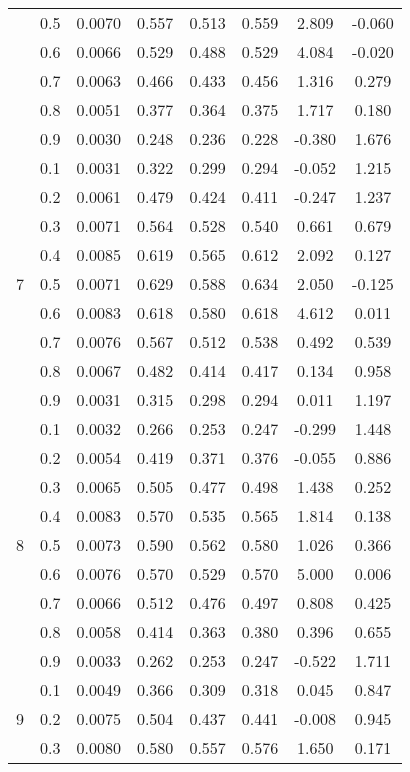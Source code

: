 \documentclass[11pt,a4paper]{report}
\begin{document}
\begin{longtable}{ | c | c || c | c | c | c | c | c | }
 & 0.5 & 0.0070 & 0.557 & 0.513 & 0.559 & 2.809 & -0.060 \\
 & 0.6 & 0.0066 & 0.529 & 0.488 & 0.529 & 4.084 & -0.020 \\
 & 0.7 & 0.0063 & 0.466 & 0.433 & 0.456 & 1.316 & 0.279 \\
 & 0.8 & 0.0051 & 0.377 & 0.364 & 0.375 & 1.717 & 0.180 \\
 & 0.9 & 0.0030 & 0.248 & 0.236 & 0.228 & -0.380 & 1.676 \\
 \hline
\multirow{9}{*}{7} & 0.1 & 0.0031 & 0.322 & 0.299 & 0.294 & -0.052 & 1.215 \\
 & 0.2 & 0.0061 & 0.479 & 0.424 & 0.411 & -0.247 & 1.237 \\
 & 0.3 & 0.0071 & 0.564 & 0.528 & 0.540 & 0.661 & 0.679 \\
 & 0.4 & 0.0085 & 0.619 & 0.565 & 0.612 & 2.092 & 0.127 \\
 & 0.5 & 0.0071 & 0.629 & 0.588 & 0.634 & 2.050 & -0.125 \\
 & 0.6 & 0.0083 & 0.618 & 0.580 & 0.618 & 4.612 & 0.011 \\
 & 0.7 & 0.0076 & 0.567 & 0.512 & 0.538 & 0.492 & 0.539 \\
 & 0.8 & 0.0067 & 0.482 & 0.414 & 0.417 & 0.134 & 0.958 \\
 & 0.9 & 0.0031 & 0.315 & 0.298 & 0.294 & 0.011 & 1.197 \\
 \hline
\multirow{9}{*}{8} & 0.1 & 0.0032 & 0.266 & 0.253 & 0.247 & -0.299 & 1.448 \\
 & 0.2 & 0.0054 & 0.419 & 0.371 & 0.376 & -0.055 & 0.886 \\
 & 0.3 & 0.0065 & 0.505 & 0.477 & 0.498 & 1.438 & 0.252 \\
 & 0.4 & 0.0083 & 0.570 & 0.535 & 0.565 & 1.814 & 0.138 \\
 & 0.5 & 0.0073 & 0.590 & 0.562 & 0.580 & 1.026 & 0.366 \\
 & 0.6 & 0.0076 & 0.570 & 0.529 & 0.570 & 5.000 & 0.006 \\
 & 0.7 & 0.0066 & 0.512 & 0.476 & 0.497 & 0.808 & 0.425 \\
 & 0.8 & 0.0058 & 0.414 & 0.363 & 0.380 & 0.396 & 0.655 \\
 & 0.9 & 0.0033 & 0.262 & 0.253 & 0.247 & -0.522 & 1.711 \\
 \hline
\multirow{9}{*}{9} & 0.1 & 0.0049 & 0.366 & 0.309 & 0.318 & 0.045 & 0.847 \\
 & 0.2 & 0.0075 & 0.504 & 0.437 & 0.441 & -0.008 & 0.945 \\
 & 0.3 & 0.0080 & 0.580 & 0.557 & 0.576 & 1.650 & 0.171 \\

\end{longtable}
\end{document}
